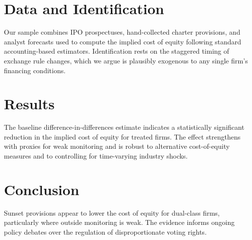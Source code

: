 \documentclass[12pt]{article}
\begin{document}
\section{Data and Identification}
Our sample combines IPO prospectuses, hand-collected charter provisions, and
analyst forecasts used to compute the implied cost of equity following standard
accounting-based estimators. Identification rests on the staggered timing of
exchange rule changes, which we argue is plausibly exogenous to any single
firm's financing conditions.

\section{Results}
The baseline difference-in-differences estimate indicates a statistically
significant reduction in the implied cost of equity for treated firms. The
effect strengthens with proxies for weak monitoring and is robust to
alternative cost-of-equity measures and to controlling for time-varying
industry shocks.

\section{Conclusion}
Sunset provisions appear to lower the cost of equity for dual-class firms,
particularly where outside monitoring is weak. The evidence informs ongoing
policy debates over the regulation of disproportionate voting rights.



\end{document}
